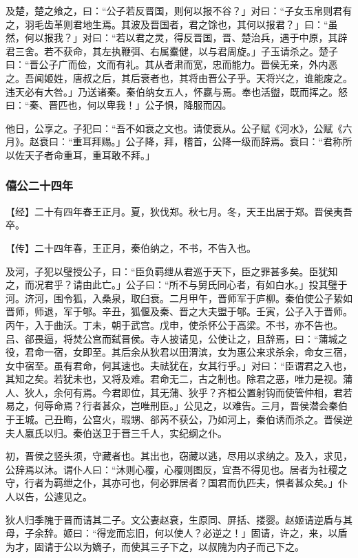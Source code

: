 \documentclass[]{article}
\begin{document}
及楚，楚之飨之，曰：``公子若反晋国，则何以报不谷？」对曰：``子女玉帛则君有之，羽毛齿革则君地生焉。其波及晋国者，君之馀也，其何以报君？」曰：``虽然，何以报我？」对曰：``若以君之灵，得反晋国，晋、楚治兵，遇于中原，其辟君三舍。若不获命，其左执鞭弭、右属櫜健，以与君周旋。」子玉请杀之。楚子曰：``晋公子广而俭，文而有礼。其从者肃而宽，忠而能力。晋侯无亲，外内恶之。吾闻姬姓，唐叔之后，其后衰者也，其将由晋公子乎。天将兴之，谁能废之。违天必有大咎。」乃送诸秦。秦伯纳女五人，怀嬴与焉。奉也活盥，既而挥之。怒曰：``秦、晋匹也，何以卑我！」公子惧，降服而囚。

他日，公享之。子犯曰：``吾不如衰之文也。请使衰从。公子赋《河水》，公赋《六月》。赵衰曰：``重耳拜赐。」公子降，拜，稽首，公降一级而辞焉。衰曰：``君称所以佐天子者命重耳，重耳敢不拜。」

\hypertarget{header-n912}{%
\subsubsection{僖公二十四年}\label{header-n912}}

【经】二十有四年春王正月。夏，狄伐郑。秋七月。冬，天王出居于郑。晋侯夷吾卒。

【传】二十四年春，王正月，秦伯纳之，不书，不告入也。

及河，子犯以璧授公子，曰：``臣负羁绁从君巡于天下，臣之罪甚多矣。臣犹知之，而况君乎？请由此亡。」公子曰：``所不与舅氏同心者，有如白水。」投其璧于河。济河，围令狐，入桑泉，取臼衰。二月甲午，晋师军于庐柳。秦伯使公子絷如晋师，师退，军于郇。辛丑，狐偃及秦、晋之大夫盟于郇。壬寅，公子入于晋师。丙午，入于曲沃。丁未，朝于武宫。戊申，使杀怀公于高梁。不书，亦不告也。吕、郤畏逼，将焚公宫而弑晋侯。寺人披请见，公使让之，且辞焉，曰：``蒲城之役，君命一宿，女即至。其后余从狄君以田渭滨，女为惠公来求杀余，命女三宿，女中宿至。虽有君命，何其速也。夫祛犹在，女其行乎。」对曰：``臣谓君之入也，其知之矣。若犹未也，又将及难。君命无二，古之制也。除君之恶，唯力是视。蒲人、狄人，余何有焉。今君即位，其无蒲、狄乎？齐桓公置射钩而使管仲相，君若易之，何辱命焉？行者甚众，岂唯刑臣。」公见之，以难告。三月，晋侯潜会秦伯于王城。己丑晦，公宫火，瑕甥、郤芮不获公，乃如河上，秦伯诱而杀之。晋侯逆夫人嬴氏以归。秦伯送卫于晋三千人，实纪纲之仆。

初，晋侯之竖头须，守藏者也。其出也，窃藏以逃，尽用以求纳之。及入，求见，公辞焉以沐。谓仆人曰：``沐则心覆，心覆则图反，宜吾不得见也。居者为社稷之守，行者为羁绁之仆，其亦可也，何必罪居者？国君而仇匹夫，惧者甚众矣。」仆人以告，公遽见之。

狄人归季隗于晋而请其二子。文公妻赵衰，生原同、屏括、搂婴。赵姬请逆盾与其母，子余辞。姬曰：``得宠而忘旧，何以使人？必逆之！」固请，许之，来，以盾为才，固请于公以为嫡子，而使其三子下之，以叔隗为内子而己下之。
\end{document}
